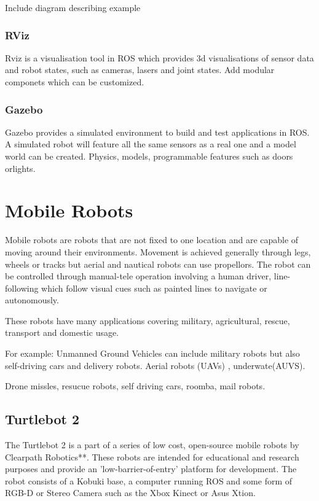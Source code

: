 \documentclass{mproj}
\begin{document}
Include diagram describing example


\subsubsection{RViz}

Rviz is a visualisation tool in ROS which provides 3d visualisations of sensor data and robot states, such as cameras, lasers and joint states. Add modular componets which can be customized.

\subsubsection{Gazebo}
Gazebo provides a simulated environment to build and test applications in ROS. A simulated robot will feature all the same sensors as a real one and a model world can be created. Physics, models, programmable features such as doors orlights.


\section{Mobile Robots}


Mobile robots are robots that are not fixed to one location and are capable of moving around their environments. Movement is achieved generally through legs, wheels or tracks but aerial and nautical robots can use propellors. The robot can be controlled through manual-tele operation involving a human driver, line-following which follow visual cues such as painted lines to navigate or autonomously.



These robots have many applications covering military, agricultural, rescue, transport and domestic usage.


 For example: Unmanned Ground Vehicles can include military robots but also self-driving cars and
delivery robots. Aerial robots (UAVs) , underwate(AUVS).

Drone missles, resucue robots, self driving cars, roomba, mail robots.

\subsection{Turtlebot 2}


The Turtlebot 2 is a part of a series of low cost, open-source mobile robots by Clearpath Robotics**. These robots are intended for educational and research purposes and provide an 'low-barrier-of-entry' platform for development. The robot consists of a Kobuki base, a computer running ROS and some form of RGB-D or Stereo Camera such as the Xbox Kinect or Asus Xtion.
\end{document}
